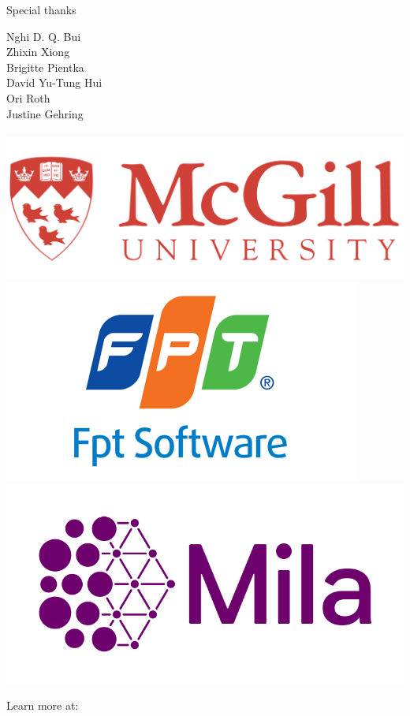\documentclass{beamer}
\begin{document}
    \begin{frame}{Special thanks}
            \begin{center}
                \LARGE{
                    Nghi D. Q. Bui\\
                    Zhixin Xiong\\
                    Brigitte Pientka\\
                    David Yu-Tung Hui\\
                    Ori Roth\\
                    Justine Gehring\\
                    \phantom{}\\
                }
                \href{https://cs.mcgill.ca}{\includegraphics[scale=0.08]{../figures/mcgill_logo.png}}
                \href{https://www.fpt-software.com}{\includegraphics[scale=0.19]{../figures/fpt_logo.png}}
                \href{https://mila.quebec}{\includegraphics[scale=0.13]{../figures/mila_logo.png}}
            \end{center}
    \end{frame}

    \begin{frame}
        \begin{center}
            \huge{Learn more at: \\~\\
            \href{https://github.com/breandan/tidyparse}{\color{blue}{https://github.com/breandan/tidyparse}}}
        \end{center}
    \end{frame}
\end{document}
